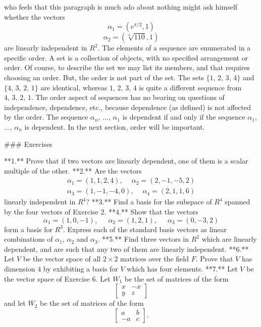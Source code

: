 who feels that this paragraph is much ado about nothing might ask himself whether the vectors \[\alpha_{1} = (e^{\pi/2},1)\] \[\alpha_{2} = (\sqrt[3]{110},1)\] are linearly independent in \(R^{2}\). The elements of a sequence are enumerated in a specific order. A set is a collection of objects, with no specified arrangement or order. Of course, to describe the set we may list its members, and that requires choosing an order. But, the order is not part of the set. The sets \(\{1,\,2,\,3,\,4\}\) and \(\{4,\,3,\,2,\,1\}\) are identical, whereas \(1,\,2,\,3,\,4\) is quite a different sequence from \(4,\,3,\,2,\,1\). The order aspect of sequences has no bearing on questions of independence, dependence, etc., because dependence (as defined) is not affected by the order. The sequence \(\alpha_{n}\), \(\ldots\), \(\alpha_{1}\) is dependent if and only if the sequence \(\alpha_{1}\), \(\ldots\), \(\alpha_{n}\) is dependent. In the next section, order will be important.

### Exercises

**1.** Prove that if two vectors are linearly dependent, one of them is a scalar multiple of the other. **2.** Are the vectors \[\begin{array}{l}\alpha_{1}=(1,1,2,4),\quad\ \alpha_{2}=(2,-1,-5,2)\\ \alpha_{3}=(1,-1,-4,0),\quad\ \alpha_{4}=(2,1,1,6)\end{array}\] linearly independent in \(R^{4}\)? **3.** Find a basis for the subspace of \(R^{4}\) spanned by the four vectors of Exercise 2. **4.** Show that the vectors \[\alpha_{1}=(1,0,-1),\quad\ \ \alpha_{2}=(1,2,1),\quad\ \ \alpha_{3}=(0,-3,2)\] form a basis for \(R^{3}\). Express each of the standard basis vectors as linear combinations of \(\alpha_{1}\), \(\alpha_{2}\) and \(\alpha_{3}\). **5.** Find three vectors in \(R^{2}\) which are linearly dependent, and are such that any two of them are linearly independent. **6.** Let \(V\) be the vector space of all \(2\times 2\) matrices over the field \(F\). Prove that \(V\) has dimension \(4\) by exhibiting a basis for \(V\) which has four elements. **7.** Let \(V\) be the vector space of Exercise 6. Let \(W_{1}\) be the set of matrices of the form \[\begin{bmatrix}x&-x\\ y&z\end{bmatrix}\] and let \(W_{2}\) be the set of matrices of the form \[\begin{bmatrix}a&b\\ -a&c\end{bmatrix}.\] 